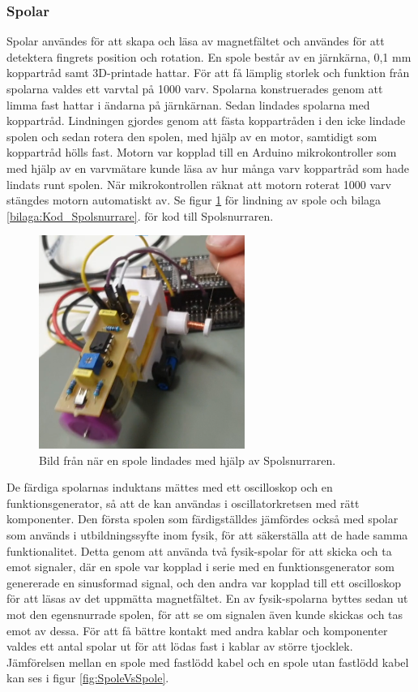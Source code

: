 \documentclass[a4paper]{article}
\begin{document}
\begin{sloppypar}
    \subsubsection{Spolar}
    Spolar användes för att skapa och läsa av magnetfältet och användes för att detektera fingrets position och rotation.
    En spole består av en järnkärna, 0,1 mm koppartråd samt 3D-printade hattar.
    För att få lämplig storlek och funktion från spolarna valdes ett varvtal på 1000 varv.
    Spolarna konstruerades genom att limma fast hattar i ändarna på järnkärnan.
    Sedan lindades spolarna med koppartråd.
    Lindningen gjordes genom att fästa koppartråden i den icke lindade spolen och sedan rotera den spolen, med hjälp av en motor,
    samtidigt som koppartråd hölls fast.
    Motorn var kopplad till en Arduino mikrokontroller som med hjälp av en varvmätare kunde läsa av hur många varv
    koppartråd som hade lindats runt spolen.
    När mikrokontrollen räknat att motorn roterat 1000 varv stängdes motorn automatiskt av. Se figur \ref{fig:Spolsnurrare} för lindning av spole och bilaga \ref{bilaga:Kod_Spolsnurrare}.
    för kod till Spolsnurraren.
    \begin{figure}[H]
        \centering
        \includegraphics[width=0.6\textwidth]{spolsnurrare1.png}
        \caption{Bild från när en spole lindades med hjälp av Spolsnurraren.}
        \label{fig:Spolsnurrare}
    \end{figure}
    \noindent
    De färdiga spolarnas induktans mättes med ett oscilloskop och en funktionsgenerator, så att de kan användas i oscillatorkretsen med rätt komponenter.
    Den första spolen som färdigställdes jämfördes också med spolar som används i utbildningssyfte inom fysik, för att säkerställa att de hade samma funktionalitet.
    Detta genom att använda två fysik-spolar för att skicka och ta emot signaler, där en spole var kopplad i serie med en funktionsgenerator som genererade en sinusformad signal,
    och den andra var kopplad till ett oscilloskop för att läsas av det uppmätta magnetfältet.
    En av fysik-spolarna byttes sedan ut mot den egensnurrade spolen, för att se om signalen även kunde skickas och tas emot av dessa.
    För att få bättre kontakt med andra kablar och komponenter valdes ett antal spolar ut för att lödas fast i kablar av större tjocklek.
    Jämförelsen mellan en spole med fastlödd kabel och en spole utan fastlödd kabel kan ses i figur \ref{fig:SpoleVsSpole}.


\end{sloppypar}
\end{document}
